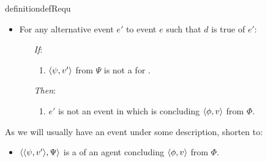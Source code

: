 \begin{note}
\begin{restatable}[A \requ{0}]{definition}{defRequ}
    \begin{itemize}
    \item
      For any alternative event \(e'\) to event \(e\) such that \(d\) is true of \(e'\):
      \begin{itemize}
      \item[\emph{If}:]
        \begin{enumerate}[label=\alph*., ref=(\alph*), series=requDefSeries]
        \item
          \label{def:requ:nK}
          \(\langle \psi, v' \rangle\) from \(\Psi\) is not a \fc{} for \vAgent{}.
        \end{enumerate}
      \item[\emph{Then}:]
        \begin{enumerate}[label=\alph*., ref=(\alph*), resume*=requDefSeries]
        \item
          \label{def:requ:nC}
          \(e'\) is not an event in which \vAgent{} is concluding \(\langle \phi, v \rangle\) from \(\Phi\).
        \end{enumerate}
      \end{itemize}
    \end{itemize}
    \vspace{-\baselineskip}
  \end{restatable}

  As we will usually have an event under some description, shorten to:
  \begin{itemize}
  \item
    \(\langle \langle \psi, v' \rangle, \Psi \rangle\) is a \requ{} of an agent concluding \(\langle \phi, v \rangle\) from \(\Phi\).
  \end{itemize}
\end{note}

